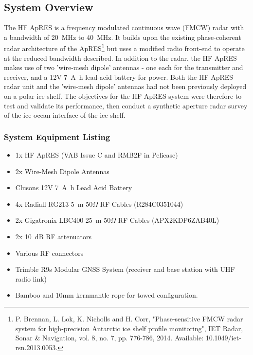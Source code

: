\documentclass[a4paper,12pt]{article}
\begin{document}
\subsection{System Overview}
The HF ApRES is a frequency modulated continuous wave (FMCW) radar with 
a bandwidth of \SI{20}{\mega\hertz} to \SI{40}{\mega\hertz}.  It builds
upon the existing phase-coherent radar architecture of the ApRES\footnote{
  P. Brennan, L. Lok, K. Nicholls and H. Corr, "Phase‐sensitive FMCW radar 
  system for high‐precision Antarctic ice shelf profile monitoring", IET 
  Radar, Sonar \& Navigation, vol. 8, no. 7, pp. 776-786, 2014. Available: 
  10.1049/iet-rsn.2013.0053.
} but uses a modified radio front-end to operate at the reduced bandwidth
described.  In addition to the radar, the HF ApRES makes use of two 'wire-mesh
dipole' antennas - one each for the transmitter and receiver, and a 12V 
\SI{7}{\ampere\hour} lead-acid battery for power.  Both the HF ApRES radar unit 
and  the 'wire-mesh dipole' antennas had not been previously deployed on a 
polar ice shelf.  The objectives for the HF ApRES system were therefore to test
and validate its performance, then conduct a synthetic aperture radar survey of
the ice-ocean interface of the ice shelf.

\subsubsection{System Equipment Listing}
\begin{itemize}
  \item 1x HF ApRES (VAB Issue C and RMB2F in Pelicase)
  \item 2x Wire-Mesh Dipole Antennas
  \item Clusons 12V \SI{7}{\ampere\hour} Lead Acid Battery
  \item 4x Radiall RG213 \SI{5}{\metre} 50$\Omega$ RF Cables (R284C0351044)
  \item 2x Gigatronix LBC400 \SI{25}{\metre} 50$\Omega$ RF Cables (APX2KDP6ZAB40L)
  \item 2x \SI{10}{\deci\bel} RF attenuators
  \item Various RF connectors
  \item Trimble R9s Modular GNSS System (receiver and base station with UHF
  radio link)
  \item Bamboo and 10mm kernmantle rope for towed configuration.
\end{itemize}
\end{document}
